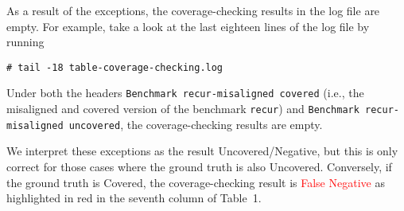 As a result of the exceptions, the coverage-checking results in the log file are
empty.
%
For example, take a look at the last eighteen lines of the log file by running
\begin{verbatim}
# tail -18 table-coverage-checking.log
\end{verbatim}
%
Under both the headers \texttt{Benchmark recur-misaligned covered} (i.e., the
misaligned and covered version of the benchmark \texttt{recur}) and
\texttt{Benchmark recur-misaligned uncovered}, the coverage-checking results are
empty.

We interpret these exceptions as the result Uncovered/Negative, but this is only
correct for those cases where the ground truth is also Uncovered.
%
Conversely, if the ground truth is Covered, the coverage-checking result is
\textcolor{red}{False Negative} as highlighted in red in the seventh column of
Table~1.

